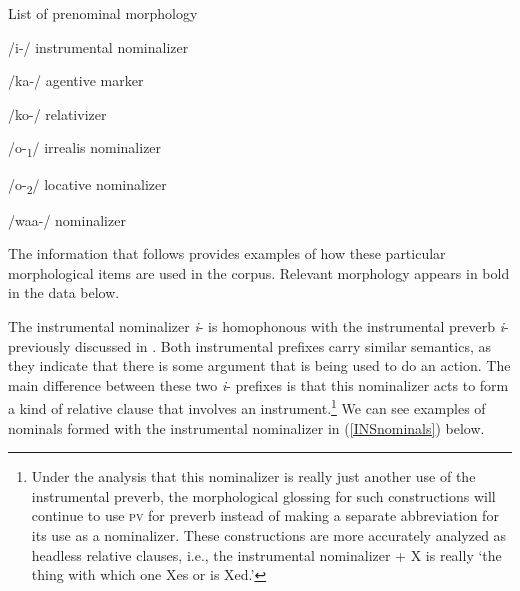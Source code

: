 \begin{exe}
\item\label{ListofPrenomMorph} List of prenominal morphology

\begin{xlist}
\item /i-/ instrumental nominalizer
\item /ka-/ agentive marker
\item /ko-/ relativizer
\item /o-\textsubscript{1}/ irrealis nominalizer
\item /o-\textsubscript{2}/ locative nominalizer
\item /waa-/ nominalizer
\end{xlist}
\end{exe}

The information that follows provides examples of how these particular morphological items are used in the corpus. Relevant morphology appears in bold in the data below.

\label{SubSubSubNomInstrumental}

The instrumental nominalizer \textit{i}- is homophonous with the instrumental preverb \textit{i}- previously discussed in . Both instrumental prefixes carry similar semantics, as they indicate that there is some argument that is being used to do an action. The main difference between these two \textit{i}- prefixes is that this nominalizer acts to form a kind of relative clause that involves an instrument.\footnote{Under the analysis that this nominalizer is really just another use of the instrumental preverb, the morphological glossing for such constructions will continue to use \textsc{pv} for preverb instead of making a separate abbreviation for its use as a nominalizer. These constructions are more accurately analyzed as headless relative clauses, i.e., the instrumental nominalizer + X is really `the thing with which one Xes or is Xed.'} We can see examples of nominals formed with the instrumental nominalizer in (\ref{INSnominals}) below.

